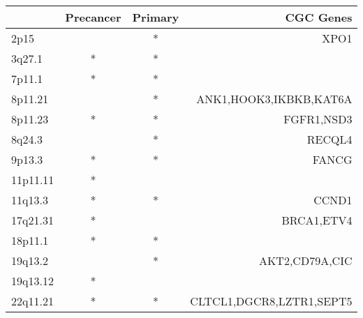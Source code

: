 \begin{tabular}{lccr}
\toprule
{} & Precancer & Primary &                 CGC Genes \\
\midrule
2p15     &           &       * &                      XPO1 \\
3q27.1   &         * &       * &                           \\
7p11.1   &         * &       * &                           \\
8p11.21  &           &       * &    ANK1,HOOK3,IKBKB,KAT6A \\
8p11.23  &         * &       * &                FGFR1,NSD3 \\
8q24.3   &           &       * &                    RECQL4 \\
9p13.3   &         * &       * &                     FANCG \\
11p11.11 &         * &         &                           \\
11q13.3  &         * &       * &                     CCND1 \\
17q21.31 &         * &         &                BRCA1,ETV4 \\
18p11.1  &         * &       * &                           \\
19q13.2  &           &       * &            AKT2,CD79A,CIC \\
19q13.12 &         * &         &                           \\
22q11.21 &         * &       * &  CLTCL1,DGCR8,LZTR1,SEPT5 \\
\bottomrule
\end{tabular}
